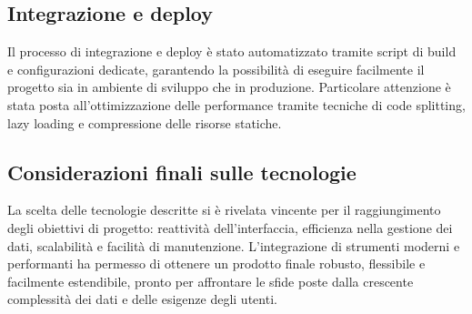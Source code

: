 \subsection{Integrazione e deploy}

Il processo di integrazione e deploy è stato automatizzato tramite script di build e configurazioni dedicate, garantendo la possibilità di eseguire facilmente il progetto sia in ambiente di sviluppo che in produzione. Particolare attenzione è stata posta all’ottimizzazione delle performance tramite tecniche di code splitting, lazy loading e compressione delle risorse statiche.

\subsection{Considerazioni finali sulle tecnologie}

La scelta delle tecnologie descritte si è rivelata vincente per il raggiungimento degli obiettivi di progetto: reattività dell’interfaccia, efficienza nella gestione dei dati, scalabilità e facilità di manutenzione. L’integrazione di strumenti moderni e performanti ha permesso di ottenere un prodotto finale robusto, flessibile e facilmente estendibile, pronto per affrontare le sfide poste dalla crescente complessità dei dati e delle esigenze degli utenti.
